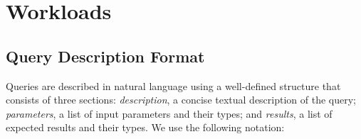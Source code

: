 \chapter{Workloads}
\label{sec:workloads}


\section{Query Description Format}
\label{sub:queries_structure}
Queries are described in natural language using a well-defined structure that consists of three sections:
\textit{description}, a concise textual description of the query;
\textit{parameters}, a list of input parameters and their types;
and \textit{results}, a list of expected results and their types.
We use the following notation:

